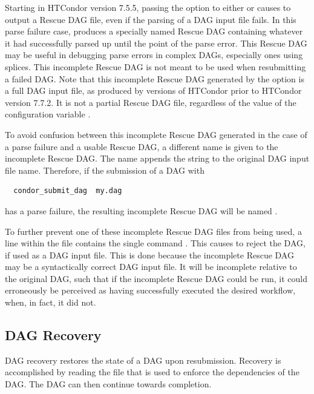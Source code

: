 Starting in HTCondor version 7.5.5, passing
the  option to either  or 
causes  to output a Rescue DAG file, 
even if the parsing of a DAG input file fails.
In this parse failure case,  produces a specially 
named Rescue DAG containing whatever it had successfully parsed up
until the point of the parse error.
This Rescue DAG may be useful in debugging parse errors in complex DAGs,
especially ones using splices.
This incomplete Rescue DAG is not meant to be used when resubmitting
a failed DAG.  
Note that this incomplete Rescue DAG generated by the 
option is a full DAG input file, 
as produced by versions of HTCondor prior to HTCondor version 7.7.2.
It is not a partial Rescue DAG file,
regardless of the value of the configuration variable
.

To avoid confusion between this incomplete Rescue DAG
generated in the case of a parse failure and a usable Rescue DAG,
a different name is given to the incomplete Rescue DAG.
The name appends the string  to the original
DAG input file name.
Therefore, if the submission of a DAG with
\begin{verbatim}
  condor_submit_dag  my.dag
\end{verbatim}
has a parse failure, the resulting incomplete Rescue DAG will be
named .

To further prevent one of these incomplete Rescue DAG files from being used,
a line within the file contains the single command .
This causes  to reject the DAG, if used as a DAG input file.
This is done because the
incomplete Rescue DAG may be a syntactically correct DAG input file.
It will be incomplete relative to the original DAG,
such that if the incomplete Rescue DAG could be run,
it could erroneously be perceived as
having successfully executed the desired workflow, when, in fact,
it did not.

\subsection{\label{sec:DAGMan-recovery}DAG Recovery}

DAG recovery restores the state of a DAG upon resubmission.
Recovery is accomplished by reading the 
file that is used to enforce the dependencies of the DAG.
The DAG can then continue towards completion.

